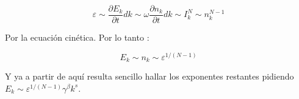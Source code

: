 \begin{equation}
	\varepsilon \sim \frac{\partial E_k}{\partial t} dk \sim \omega \frac{\partial n_k}{\partial t} dk \sim I_k^N \sim n_k^{N-1}
\end{equation}

Por la ecuación cinética. Por lo tanto \cite{deikeEtudesExperimentalesNumeriques2013}:  

\begin{equation} 
	E_k \sim n_k \sim \varepsilon^{1/(N-1)}
\end{equation}

Y ya a partir de aquí resulta sencillo hallar los exponentes restantes pidiendo $E_k\sim\varepsilon^{1/(N-1)}\gamma^{\beta}k^{s}$. 












